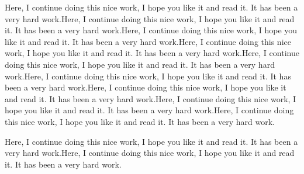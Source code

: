 \documentclass[a4paper, 12pt]{article}
\begin{document}
Here, I continue doing this nice work, I hope you like it and read it. It has been a very hard work.Here, I continue doing this nice work, I hope you like it and read it. It has been a very hard work.Here, I continue doing this nice work, I hope you like it and read it. It has been a very hard work.Here, I continue doing this nice work, I hope you like it and read it. It has been a very hard work.Here, I continue doing this nice work, I hope you like it and read it. It has been a very hard work.Here, I continue doing this nice work, I hope you like it and read it. It has been a very hard work.Here, I continue doing this nice work, I hope you like it and read it. It has been a very hard work.Here, I continue doing this nice work, I hope you like it and read it. It has been a very hard work.Here, I continue doing this nice work, I hope you like it and read it. It has been a very hard work.

Here, I continue doing this nice work, I hope you like it and read it. It has been a very hard work.Here, I continue doing this nice work, I hope you like it and read it. It has been a very hard work.
\end{document}
